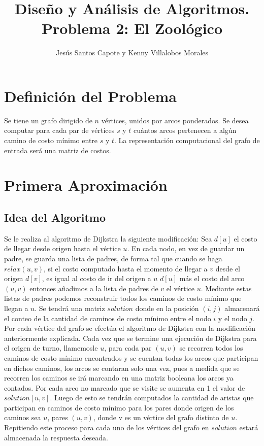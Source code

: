 \documentclass[article]{llncs}
\begin{document}
%
\title{Dise\~{n}o y An\'alisis de Algoritmos. Problema 2: El Zool\'ogico}
%
%
\author{Jes\'us Santos Capote y Kenny Villalobos Morales}
%
%
\maketitle              %
%
\section{Definici\'on del Problema}

Se tiene un grafo dirigido de $n$ vértices, unidos por arcos ponderados. Se desea computar para cada par 
de vértices $s$ y $t$ cuántos arcos pertenecen a algún camino de costo mínimo entre $s$ y $t$. La 
representación computacional del grafo de entrada será una matriz de costos.

\section{Primera Aproximaci\'on}

\subsection{Idea del Algoritmo}

Se le realiza al algoritmo de Dijkstra la siguiente modificaci\'on: Sea $d[u]$ el costo de llegar desde origen hasta el v\'ertice $u$.   
En cada nodo, en vez de guardar un padre, se guarda una lista de padres, de forma tal que  
cuando se haga $relax(u, v)$, si el costo 
computado hasta el momento de llegar a $v$  desde el origen $d[v]$, es igual al costo de ir del origen a $u$ $d[u]$ m\'as 
el costo del arco $(u,v)$ entonces a\~{n}adimos a la lista de padres de $v$ el v\'ertice $u$. Mediante estas listas de padres
podemos reconstruir todos los caminos de costo m\'inimo que llegan a $u$. Se tendr\'a una matriz \textbf{$solution$}
donde en la posici\'on $(i,j)$ almacenar\'a el conteo de la cantidad de caminos de costo m\'inimo entre el nodo $i$ y el nodo $j$. Por cada 
v\'ertice del grafo se efect\'ua el algoritmo de Dijkstra con la modificaci\'on anteriormente explicada. 
Cada vez que se termine una ejecuci\'on de Dijkstra para el origen de turno, llamemosle $u$, para cada par $(u, v)$ se recorren todos los caminos 
de costo m\'inimo encontrados y se cuentan todas los arcos que participan en dichos caminos, los arcos se 
contaran solo una vez, pues a medida que se recorren los caminos se ir\'a marcando en una matriz booleana los arcos ya contados. Por cada arco no marcado 
que se visite se aumenta en 1 el valor de \textbf{$solution[u, v]$}. 
Luego de esto se tendr\'an 
computados la cantidad de aristas que participan en caminos de costo m\'inimo para los pares donde 
origen de los caminos sea $u$, pares $(u,v)$, donde v es un v\'ertice del grafo distinto de $u$. Repitiendo este proceso para cada uno de los v\'ertices del grafo 
en \textbf{$solution$} estar\'a almacenada la respuesta deseada.
\end{document}
